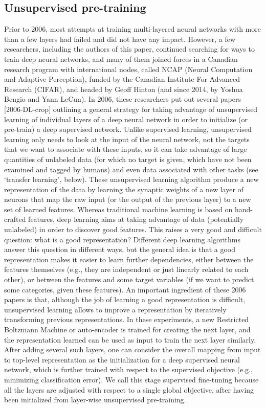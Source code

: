 \documentclass{article} %
\begin{document}
\subsection{Unsupervised pre-training}

Prior to 2006, most attempts at training multi-layered neural networks with
more than a few layers had failed and did not have any impact. However, a
few researchers, including the authors of this paper, continued searching
for ways to train deep neural networks, and many of them joined forces in a
Canadian research program with international nodes, called NCAP (Neural
Computation and Adaptive Perception), funded by the Canadian Institute For
Advanced Research (CIFAR), and headed by Geoff Hinton (and since 2014, by
Yoshua Bengio and Yann LeCun). In 2006, these researchers put out several
papers [2006-DL-crop] outlining a general strategy for taking advantage of
unsupervised learning of individual layers of a deep neural network in
order to initialize (or pre-train) a deep supervised network. Unlike
supervised learning, unsupervised learning only needs to look at the input
of the neural network, not the targets that we want to associate with these
inputs, so it can take advantage of large quantities of unlabeled data (for
which no target is given, which have not been examined and tagged by
humans) and even data associated with other tasks (see ‘transfer learning’,
below).  These unsupervised learning algorithm produce a new representation
of the data by learning the synaptic weights of a new layer of neurons that
map the raw input (or the output of the previous layer) to a new set of
learned features. Whereas traditional machine learning is based on
hand-crafted features, deep learning aims at taking advantage of data
(potentially unlabeled) in order to discover good features. This raises a
very good and difficult question: what is a good representation? Different
deep learning algorithms answer this question in different ways, but the
general idea is that a good representation makes it easier to learn further
dependencies, either between the features themselves (e.g., they are
independent or just linearly related to each other), or between the
features and some target variables (if we want to predict some categories,
given these features). An important ingredient of these 2006 papers is
that, although the job of learning a good representation is difficult,
unsupervised learning allows to improve a representation by iteratively
transforming previous representations. In these experiments, a new
Restricted Boltzmann Machine or auto-encoder is trained for creating the
next layer, and the representation learned can be used as input to train
the next layer similarly. After adding several such layers, one can
consider the overall mapping from input to top-level representation as the
initialization for a deep supervised neural network, which is further
trained with respect to the supervised objective (e.g., minimizing
classification error). We call this stage supervised fine-tuning because
all the layers are adjusted with respect to a single global objective,
after having been initialized from layer-wise unsupervised pre-training.
\end{document}
